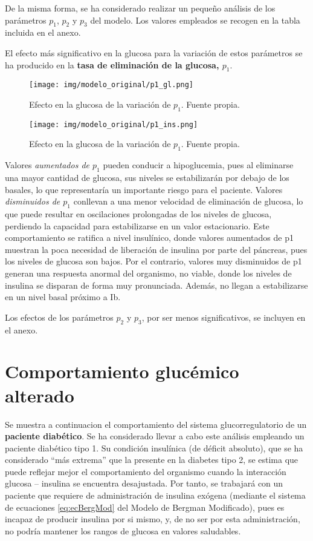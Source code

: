 \clearpage
De la misma forma, se ha considerado realizar un pequeño análisis de los parámetros $p_1$, $p_2$ y $p_3$ del modelo. Los valores empleados se recogen en la tabla incluida en el anexo.

El efecto más significativo en la glucosa para la variación de estos parámetros se ha producido en la \textbf{tasa de eliminación de la glucosa, $p_1$}.

\begin{figure}[htbp]
    \centering
    \texttt{[image: img/modelo\_original/p1\_gl.png]}
    \caption{Efecto en la glucosa de la variación de $p_1$. Fuente propia.}
    \label{fig:p1_gluc}
\end{figure}
\begin{figure}[htbp]
    \centering
    \texttt{[image: img/modelo\_original/p1\_ins.png]}
    \caption{Efecto en la glucosa de la variación de $p_1$. Fuente propia.}
    \label{fig:p1_ins}
\end{figure}

Valores \textit{aumentados de $p_1$} pueden conducir a hipoglucemia, pues al eliminarse una mayor cantidad de glucosa, sus niveles se estabilizarán por debajo de los basales, lo que representaría un importante riesgo para el paciente.  Valores \textit{disminuidos de $p_1$} conllevan a una menor velocidad de eliminación de glucosa, lo que puede resultar en oscilaciones prolongadas de los niveles de glucosa, perdiendo la capacidad para estabilizarse en un valor estacionario.
Este comportamiento se ratifica a nivel insulínico, donde valores aumentados de p1 muestran la poca necesidad de liberación de insulina por parte del páncreas, pues los niveles de glucosa son bajos. Por el contrario, valores muy disminuidos de p1 generan una respuesta anormal del organismo, no viable, donde los niveles de insulina se disparan de forma muy pronunciada. Además, no llegan a estabilizarse en un nivel basal próximo a Ib.

Los efectos de los parámetros $p_2$ y $p_3$, por ser menos significativos, se incluyen en el anexo.

\section{Comportamiento glucémico alterado}

Se muestra a continuacion el comportamiento del sistema glucorregulatorio de un \textbf{paciente diabético}. Se ha considerado llevar a cabo este análisis empleando un paciente diabético tipo 1. Su condición insulínica (de déficit absoluto), que se ha considerado “más extrema” que la presente en la diabetes tipo 2, se estima que puede reflejar mejor el comportamiento del organismo cuando la interacción glucosa – insulina se encuentra desajustada. Por tanto, se trabajará con un paciente que requiere de administración de insulina exógena (mediante el sistema de ecuaciones \ref{eq:ecBergMod} del Modelo de Bergman Modificado), pues es incapaz de producir insulina por si mismo, y, de no ser por esta administración, no podría mantener los rangos de glucosa en valores saludables. 

